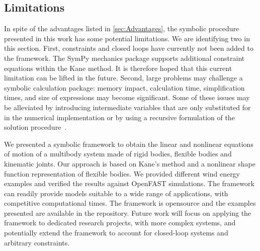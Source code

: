 \documentclass[wes, manuscript]{copernicus}
\begin{document}
\subsection{Limitations}
In spite of the advantages listed in \autoref{sec:Advantages}, the symbolic procedure presented in this work has some potential limitations.
We are identifying two in this section.
First, constraints and closed loops have currently not been added to the framework.
The SymPy mechanics package supports additional constraint equations within the Kane method.
It is therefore hoped that this current limitation can be lifted in the future.
Second, large problems may challenge a symbolic calculation package: memory impact, calculation time, simplification times, and size of expressions may become significant.
Some of these issues may be alleviated by introducing intermediate variables that are only substituted for in the numerical implementation or by using a recursive formulation of the solution procedure~\citep{branlard:2019flex}.



\conclusions

We presented a symbolic framework to obtain the linear and nonlinear equations of motion of a multibody system made of rigid bodies, flexible bodies and kinematic joints.
Our approach is based on Kane's method and a nonlinear shape function representation of flexible bodies.
We provided different wind energy examples and verified the results against OpenFAST simulations.
The framework can readily provide models suitable to a wide range of applications, with competitive computational times.
The framework is opensource and the examples presented are available in the repository.
Future work will focus on applying the framework to dedicated research projects, with more complex systems, and potentially extend the framework to account for closed-loop systems and arbitrary constraints.






\end{document}
